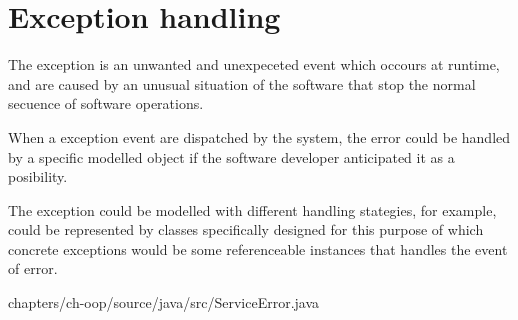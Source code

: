 \section{Exception handling}

The exception is an unwanted and 
unexpeceted event which occours 
at runtime, and are caused by an unusual 
situation of the software that  
stop the normal secuence of  
software operations. 

When a exception event are 
dispatched by the system, 
the error could be handled 
by a specific modelled object 
if the software developer anticipated  
it as a posibility. 

The exception could be modelled 
with different handling stategies,     
\cite{MoonStallman:1983}
\cite{Dony:1988}
\cite{DonyC:1990}
\cite{Leavens:1991}
for example, could be represented 
by classes specifically 
designed for this purpose of which 
concrete exceptions would be some
referenceable instances that 
handles the event of error. 

%	
%	
%	




	
	{chapters/ch-oop/source/java/src/ServiceError.java}

